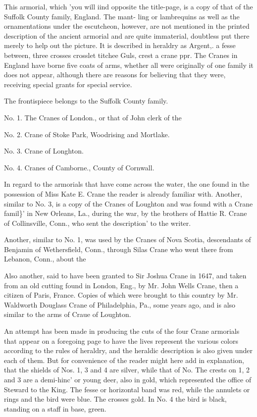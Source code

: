 \documentclass[oneside]{book}
\begin{document}
This armorial, which 'you will iind opposite the title-page, is a 
copy of that of the Suffolk County family, England. The mant- 
ling or lambrequins as well as the ornamentations under the 
escutcheon, however, are not mentioned in the printed description 
of the ancient armorial and are quite immaterial, doubtless put 
there merely to help out the picture. It is described in heraldry 
as Argent,. a fesse between, three crosses crosslet titchee Guls, 
crest a crane ppr. The Cranes in England have borne five coats 
of arms, whether all were originally of one family it does not 
appear, although there are reasons for believing that they were, 
receiving special grants for special service. 

The frontispiece belongs to the Suffolk County family. 

No. 1. The Cranes of London., or that of John clerk of the 

No. 2. Crane of Stoke Park, Woodrising and Mortlake. 

No. 3. Crane of Longhton. 

No. 4. Cranes of Camborne., County of Cornwall. 

In regard to the armorials that have come across the water, the 
one found in the possession of Miss Kate E. Crane the reader is 
already familiar with. Another, similar to No. 3, is a copy of 
the Cranes of Loughton and was found with a Crane famil\}' in 
New Orleans, La., during the war, by the brothers of Hattie R. 
Crane of Collinsville, Conn., who sent the description' to the 
writer. 

Another, similar to No. 1, was used by the Cranes of Nova 
Scotia, descendants of Benjamin of Wethersfield, Conn., through 
Silas Crane who went there from Lebanon, Conn., about the 

Also another, said to have been granted to Sir Joshua Crane in 
1647, and taken from an old cutting found in London, Eng., by 
Mr. John Wells Crane, then a citizen of Paris, France. Copies 
of which were brought to this country by Mr. Waldworth Douglass
Crane of Philadelphia, Pa., some years ago, and is also similar 
to the arms of Craue of Loughton. 

An attempt has been made in producing the cuts of the four 
Crane armorials that appear on a foregoing page to have the lives 
represent the various colors according to the rules of heraldry, 
and the heraldic description is also given under each of them. 
But for convenience of the reader might here add in explanation, 
that the shields of Nos. 1, 3 and 4 are silver, while that of No. 
The crests on 1, 2 and 3 are a demi-hinc' or young deer, also in 
gold, which represented the office of Steward to the King. The 
fesse or horizontal band was red, while the annulets or rings and 
the bird were blue. The crosses gold. In No. 4 the bird is 
black, standing on a staff in base, green. 
\end{document}
